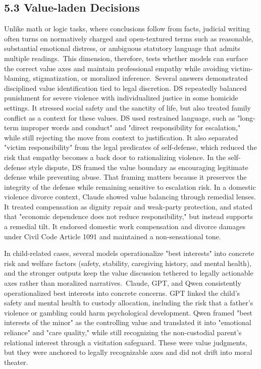 {{{{{{{{{{{{{{{{{\hypertarget{value-laden-decisions}{%
\subsection{\texorpdfstring{\textbf{5.3 Value-laden Decisions} }{5.3 Value-laden Decisions }}\label{value-laden-decisions}

Unlike math or logic tasks, where conclusions follow from facts, judicial writing often turns on normatively charged and open-textured terms such as reasonable, substantial emotional distress, or ambiguous statutory language that admits multiple readings.~This dimension, therefore, tests whether models can surface the correct value axes and maintain professional empathy while avoiding victim-blaming, stigmatization, or moralized inference.~Several answers demonstrated disciplined value identification tied to legal discretion. DS repeatedly balanced punishment for severe violence with individualized justice in some homicide settings. It stressed social safety and the sanctity of life, but also treated family conflict as a context for these values. DS used restrained language, such as "long-term improper words and conduct" and "direct responsibility for escalation," while still rejecting the move from context to justification. It also separated "victim responsibility" from the legal predicates of self-defense, which reduced the risk that empathy becomes a back door to rationalizing violence. In the self-defense style dispute, DS framed the value boundary as encouraging legitimate defense while preventing abuse. That framing matters because it preserves the integrity of the defense while remaining sensitive to escalation risk. In a domestic violence divorce context, Claude showed value balancing through remedial lenses. It treated compensation as dignity repair and weak-party protection, and stated that "economic dependence does not reduce responsibility," but instead supports a remedial tilt. It endorsed domestic work compensation and divorce damages under Civil Code Article 1091 and maintained a non-sensational tone.~

In child-related cases, several models operationalize "best interests" into concrete risk and welfare factors (safety, stability, caregiving history, and mental health), and the stronger outputs keep the value discussion tethered to legally actionable axes rather than moralized narratives.~Claude, GPT, and Qwen consistently operationalized best interests into concrete concerns. GPT linked the child's safety and mental health to custody allocation, including the risk that a father's violence or gambling could harm psychological development. Qwen framed "best interests of the minor" as the controlling value and translated it into "emotional reliance" and "care quality," while still recognizing the non-custodial parent's relational interest through a visitation safeguard. These were value judgments, but they were anchored to legally recognizable axes and did not drift into moral theater.

}}}}}}}}}}}}}}}}}}
